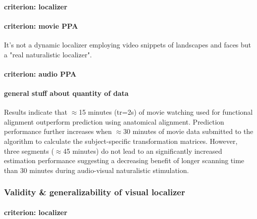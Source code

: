 
\paragraph{criterion: localizer}

\paragraph{criterion: movie PPA}

%
It's not a dynamic localizer employing video snippets of landscapes and faces
but a "real naturalistic localizer".

\paragraph{criterion: audio PPA}

\paragraph{general stuff about quantity of data}

%
Results indicate that $\approx$15 minutes (\ac{tr}=2s) of movie watching used
for functional alignment outperform prediction using anatomical alignment.
%
Prediction performance further increases when $\approx$30 minutes of movie data
submitted to the algorithm to calculate the subject-specific transformation
matrices.
%
However, three segments ($\approx$45 minutes) do not lead to an significantly
increased estimation performance suggesting a decreasing benefit of longer
scanning time than 30 minutes during audio-visual naturalistic stimulation.



\subsubsection{Validity \& generalizability of visual localizer}



\paragraph{criterion: localizer}

